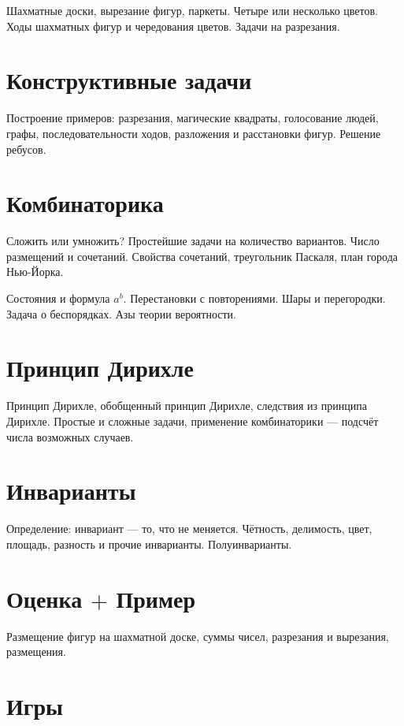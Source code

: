 \documentclass[a4paper,11pt,landscape]{article}
\begin{document}
\begin{paracol}{2}
Шахматные доски, вырезание фигур, паркеты. Четыре или несколько цветов. Ходы шахматных фигур и чередования цветов. Задачи на разрезания. 

\section{Конструктивные задачи}

Построение примеров: разрезания, магические квадраты, голосование людей, графы, последовательности ходов, разложения и расстановки фигур. Решение ребусов.

\switchcolumn
\setcounter{section}{6}

\section{Комбинаторика}

Сложить или умножить? Простейшие задачи на количество вариантов. Число размещений и сочетаний. Свойства сочетаний, треугольник Паскаля, план города Нью-Йорка. 

Состояния и формула $a^b$\!. Перестановки с повторениями. Шары и перегородки. Задача о беспорядках. Азы теории вероятности.

\section{Принцип Дирихле}

Принцип Дирихле, обобщенный принцип Дирихле, следствия из принципа Дирихле. Простые и сложные задачи, применение комбинаторики — подсчёт числа возможных случаев.

\section{Инварианты}

Определение: инвариант — то, что не меняется. Чётность, делимость, цвет, площадь, разность и прочие инварианты. Полуинварианты.

\section{Оценка $+$ Пример}

Размещение фигур на шахматной доске, суммы чисел, разрезания и вырезания, размещения.

\section{Игры}


\end{paracol}
\end{document}
